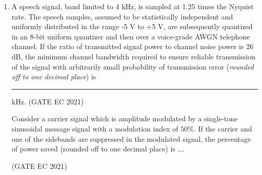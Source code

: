 \begin{enumerate}[label=\thechapter.\arabic*,ref=\thechapter.\theenumi]
\item A speech signal, band limited to 4 kHz, is sampled at 1.25 times the Nyquist rate. The speech samples, assumed to be statistically independent and uniformly distributed in the range -5 V to +5 V, are subsequently quantized in an 8-bit uniform quantizer and then over a voice-grade AWGN telephone channel. If the ratio of transmitted signal power to channel noise power is 26 dB, the minimum channel bandwidth required to ensure reliable transmission of the signal with arbitrarily small probability of transmission error (\textit{rounded off to one decimal place}) is \rule{1cm}{0.15mm} kHz.
\hfill (GATE EC 2021)
\solution

\pagebreak

Consider a carrier signal which is amplitude modulated by a single-tone sinusoidal message signal with a modulation index of $50\%$. If the carrier and one of the sidebands are suppressed in the modulated signal, the percentage of power saved (rounded off to one decimal place) is \ldots.

\hfill(GATE EC 2021)
\solution

\pagebreak
\end{enumerate}
